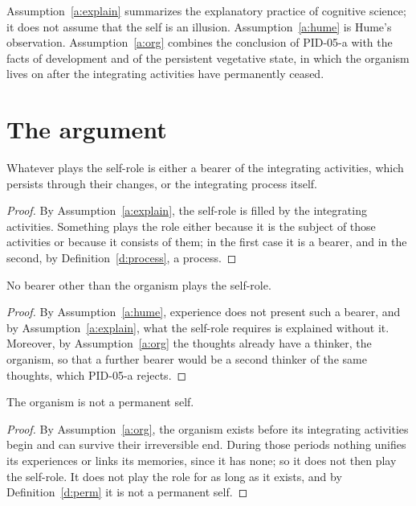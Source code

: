 \documentclass{situationist-preprint}
\begin{document}
Assumption~\ref{a:explain} summarizes the explanatory practice of cognitive science; it does not assume that the self is an illusion. Assumption~\ref{a:hume} is Hume's observation. Assumption~\ref{a:org} combines the conclusion of PID-05-a with the facts of development and of the persistent vegetative state, in which the organism lives on after the integrating activities have permanently ceased.

\section{The argument}\label{s:arg}

\begin{lemma}\label{l:dich}
Whatever plays the self-role is either a bearer of the integrating activities, which persists through their changes, or the integrating process itself.
\end{lemma}

\begin{proof}
By Assumption~\ref{a:explain}, the self-role is filled by the integrating activities. Something plays the role either because it is the subject of those activities or because it consists of them; in the first case it is a bearer, and in the second, by Definition~\ref{d:process}, a process.
\end{proof}

\begin{lemma}\label{l:nobearer}
No bearer other than the organism plays the self-role.
\end{lemma}

\begin{proof}
By Assumption~\ref{a:hume}, experience does not present such a bearer, and by Assumption~\ref{a:explain}, what the self-role requires is explained without it. Moreover, by Assumption~\ref{a:org} the thoughts already have a thinker, the organism, so that a further bearer would be a second thinker of the same thoughts, which PID-05-a rejects.
\end{proof}

\begin{lemma}\label{l:organism}
The organism is not a permanent self.
\end{lemma}

\begin{proof}
By Assumption~\ref{a:org}, the organism exists before its integrating activities begin and can survive their irreversible end. During those periods nothing unifies its experiences or links its memories, since it has none; so it does not then play the self-role. It does not play the role for as long as it exists, and by Definition~\ref{d:perm} it is not a permanent self.
\end{proof}
\end{document}
